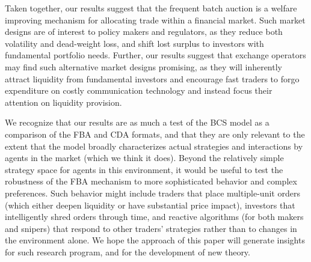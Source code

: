\documentclass[12pt]{article}
\begin{document}
Taken together, our results suggest that the frequent batch auction is a welfare improving mechanism for allocating trade within a financial market. Such market designs are of interest to policy makers and regulators, as they reduce both volatility and dead-weight loss, and shift lost surplus to investors with fundamental portfolio needs. Further, our results suggest that exchange operators may find such alternative market designs promising, as they will inherently attract liquidity from fundamental investors and encourage fast traders to forgo expenditure on costly communication technology and instead focus their attention on liquidity provision. 

We recognize that our results are as much a test of the BCS model as a comparison of the FBA and CDA formats, and that they are only relevant to the extent that the model broadly characterizes actual strategies and interactions by agents in the market (which we think it does). Beyond the relatively simple strategy space for agents in this environment, it would be useful to test the robustness of the FBA mechanism to more sophisticated behavior and complex preferences. Such behavior might include traders that place multiple-unit orders (which either deepen liquidity or have substantial price impact), investors that intelligently shred orders through time, and reactive algorithms (for both makers and snipers) that respond to other traders’ strategies rather than to changes in the environment alone. We hope the approach of this paper will generate insights for such research program, and for the development of new theory.


\end{document}
